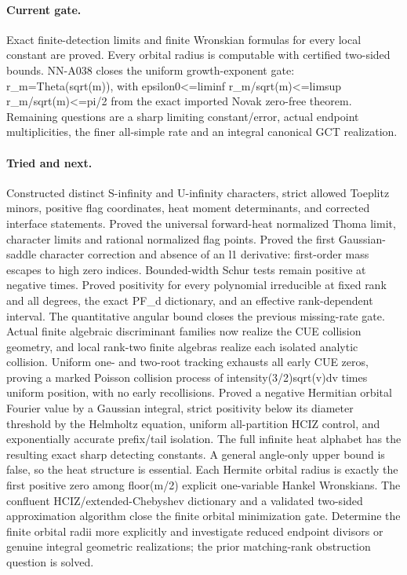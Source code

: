 \paragraph{Current gate.} Exact finite-detection limits and finite Wronskian formulas for every local constant are proved. Every orbital radius is computable with certified two-sided bounds. NN-A038 closes the uniform growth-exponent gate: r\_m=Theta(sqrt(m)), with epsilon0<=liminf r\_m/sqrt(m)<=limsup r\_m/sqrt(m)<=pi/2 from the exact imported Novak zero-free theorem. Remaining questions are a sharp limiting constant/error, actual endpoint multiplicities, the finer all-simple rate and an integral canonical GCT realization.
\paragraph{Tried and next.} Constructed distinct S-infinity and U-infinity characters, strict allowed Toeplitz minors, positive flag coordinates, heat moment determinants, and corrected interface statements. Proved the universal forward-heat normalized Thoma limit, character limits and rational normalized flag points. Proved the first Gaussian-saddle character correction and absence of an l1 derivative: first-order mass escapes to high zero indices. Bounded-width Schur tests remain positive at negative times. Proved positivity for every polynomial irreducible at fixed rank and all degrees, the exact PF\_d dictionary, and an effective rank-dependent interval. The quantitative angular bound closes the previous missing-rate gate. Actual finite algebraic discriminant families now realize the CUE collision geometry, and local rank-two finite algebras realize each isolated analytic collision. Uniform one- and two-root tracking exhausts all early CUE zeros, proving a marked Poisson collision process of intensity(3/2)sqrt(v)dv times uniform position, with no early recollisions. Proved a negative Hermitian orbital Fourier value by a Gaussian integral, strict positivity below its diameter threshold by the Helmholtz equation, uniform all-partition HCIZ control, and exponentially accurate prefix/tail isolation. The full infinite heat alphabet has the resulting exact sharp detecting constants. A general angle-only upper bound is false, so the heat structure is essential. Each Hermite orbital radius is exactly the first positive zero among floor(m/2) explicit one-variable Hankel Wronskians. The confluent HCIZ/extended-Chebyshev dictionary and a validated two-sided approximation algorithm close the finite orbital minimization gate. Determine the finite orbital radii more explicitly and investigate reduced endpoint divisors or genuine integral geometric realizations; the prior matching-rank obstruction question is solved.

